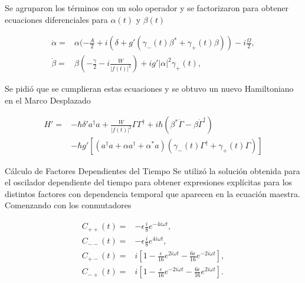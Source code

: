 \documentclass[11pt]{beamer}
\begin{document}
\begin{frame}
Se agruparon los términos con un solo operador y se factorizaron para obtener ecuaciones diferenciales para $\alpha(t)$ y $\beta(t)$

\begin{align}
\dot{\alpha} =& \alpha(-\frac{A}{2}+i(\delta+g'(\gamma_-(t) \beta^* + \gamma_+(t) \beta))-i\frac{\Omega}{2},\\
\dot{\beta} =& \beta(-\frac{\gamma}{2}-i\frac{W}{|f(t)|^2})+ig'|\alpha|^2\gamma_+(t),
\end{align}


\end{frame}

\begin{frame}
Se pidió que se cumplieran estas ecuaciones y se obtuvo un nuevo Hamiltoniano en el Marco Desplazado

\begin{align}
H'=& \nonumber -\hbar \delta' a^\dagger a + \frac{W}{|f(t)|^2}\Gamma \Gamma^\dagger + i\hbar(\beta^*\dot{\Gamma} - \beta \dot{\Gamma}^\dagger) \\
&-\hbar g'[(a^{\dagger}a +\alpha a^{\dagger}+\alpha^* a)(\gamma_-(t)\Gamma^{\dagger}+\gamma_+(t)\Gamma)]
\end{align}
\end{frame}

\begin{frame}{Cálculo de Factores Dependientes del Tiempo}
Se utilizó la solución obtenida para el oscilador dependiente del tiempo para obtener expresiones explícitas para los distintos factores con dependencia temporal que aparecen en la ecuación maestra. Comenzando con los conmutadores

\begin{align}
C_{++}(t) =& -\epsilon\frac{i}{8}e^{-4i\omega t},\\
C_{--}(t) =& -\epsilon\frac{i}{8}e^{4i\omega t},\\
C_{+-}(t) =& i [1 -\frac{\epsilon}{16}e^{2i\omega t}-\frac{6\epsilon}{16}e^{-2i\omega t}],\\
C_{-+}(t) =& i [1 -\frac{\epsilon}{16}e^{-2i\omega t}-\frac{6\epsilon}{16}e^{2i\omega t}].
\end{align}

\end{frame}
\end{document}
